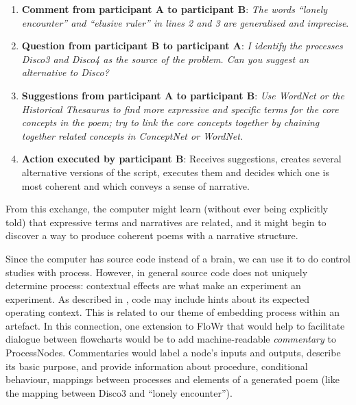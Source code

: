 \begin{enumerate}
\item \textbf{Comment from participant $\mathbf{A}$ to participant $\mathbf{B}$}: {\em The words ``lonely encounter'' and ``elusive ruler'' in lines 2 and 3 are generalised and imprecise}.
\item \textbf{Question from participant $\mathbf{B}$ to participant $\mathbf{A}$}: {\em I identify the processes {\em Disco3} and {\em Disco4} as the source of the problem. Can you suggest an alternative to Disco?} 
\item \textbf{Suggestions from participant $\mathbf{A}$ to participant $\mathbf{B}$}: {\em Use WordNet or the Historical Thesaurus to find more expressive and specific terms for the core concepts in the poem; try to link the core concepts together by chaining together related concepts in ConceptNet or WordNet.}%
\item \textbf{Action executed by participant $\mathbf{B}$}: Receives suggestions, creates several alternative versions of the script, executes them and decides which one is most coherent and which conveys a sense of narrative.
\end{enumerate}

\noindent From this exchange, the computer might learn (without ever being explicitly told) that expressive terms and narratives are related, and it might begin to discover a way to produce coherent poems with a narrative structure.

\medskip

Since the computer has source code instead of a brain, we can use it to do control studies with process.  However, in general source code does not uniquely determine process: contextual effects are what make an experiment an experiment.  As described in \cite{cook2013mechanics}, code may include hints about its expected operating context.  This is related to our theme of embedding process within an artefact.
%
In this connection, one extension to FloWr that would help to facilitate dialogue between flowcharts would be to add machine-readable \emph{commentary} to ProcessNodes.  Commentaries would label a node's inputs and outputs, describe its basic purpose, and provide information about procedure, conditional behaviour, mappings between processes and elements of a generated poem (like the mapping between Disco3 and ``lonely encounter''). 

